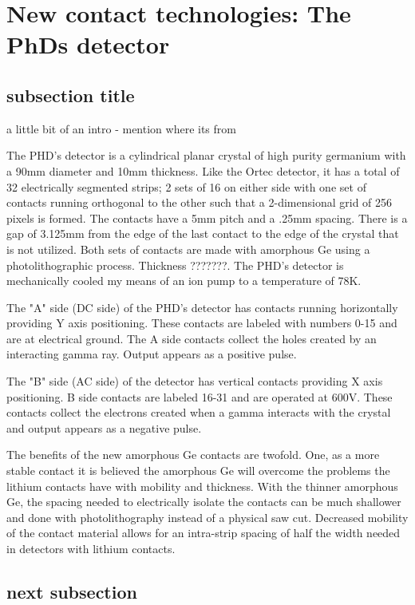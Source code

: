 \chapter{New contact technologies: The PhDs detector}
\label{ch:New contact technologies: The PhDs detector}
\section{subsection title}
\indent a little bit of an intro  -  mention where its from

The PHD's detector is a cylindrical planar crystal of high purity germanium with a 90mm diameter and 10mm thickness. Like the Ortec detector, it has a total of 32 electrically segmented strips; 2 sets of 16 on either side with one set of contacts running orthogonal to the other such that a 2-dimensional grid of 256 pixels is formed. The contacts have a 5mm pitch and a .25mm spacing. There is a gap of 3.125mm from the edge of the last contact to the edge of the crystal that is not utilized. Both sets of contacts are made with amorphous Ge using a photolithographic process. Thickness ???????. The PHD's detector is mechanically cooled my means of an ion pump to a temperature of 78K.

The "A" side (DC side) of the PHD's detector has contacts running horizontally providing Y axis positioning. These contacts are labeled with numbers 0-15 and are at electrical ground. The A side contacts collect the holes created by an interacting gamma ray. Output appears as a positive pulse. 

The "B" side (AC side) of the detector has vertical contacts providing X axis positioning. B side contacts are labeled 16-31 and are operated at 600V. These contacts collect the electrons created when a gamma interacts with the crystal and output appears as a negative pulse.

The benefits of the new amorphous Ge contacts are twofold. One, as a more stable contact it is believed the amorphous Ge will overcome the problems the lithium contacts have with mobility and thickness. With the thinner amorphous Ge, the spacing needed to electrically isolate the contacts can be much shallower and done with photolithography instead of a physical saw cut. Decreased mobility of the contact material allows for an intra-strip spacing of half the width needed in detectors with lithium contacts.

\section{next subsection}
\indent 




 


 